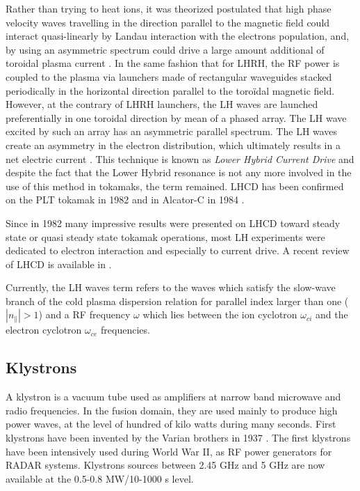 Rather than trying to heat ions, it was theorized postulated that high phase velocity waves travelling in the direction parallel to the magnetic field could interact quasi-linearly by Landau interaction with the electrons population, and, by using an asymmetric spectrum could drive a large amount additional of toroidal plasma current . In the same fashion that for LHRH, the RF power is coupled to the plasma via launchers made of rectangular waveguides stacked periodically in the horizontal direction parallel to the toroïdal magnetic field. However, at the contrary of LHRH launchers, the LH waves are launched preferentially in one toroidal direction by mean of a phased array. The LH wave excited by such an array has an asymmetric parallel spectrum. The LH waves create an asymmetry in the electron distribution, which ultimately results in a net electric current . This technique is known as \emph{Lower Hybrid Current Drive} and despite the fact that the Lower Hybrid resonance is not any more involved in the use of this method in tokamaks, the term remained. LHCD has been confirmed on the PLT tokamak in 1982  and in Alcator-C in 1984 . 

Since in 1982 many impressive results were presented on LHCD toward steady state or quasi steady state tokamak operations, most LH experiments were dedicated to electron interaction and especially to current drive. A recent review of LHCD is available in .

Currently, the LH waves term refers to the waves which satisfy the slow-wave branch of the cold plasma dispersion relation for parallel index larger than one ($|n_{\parallel}|>1$) and a RF frequency $\omega$ which lies between the ion cyclotron $\omega_{ci}$ and the electron cyclotron $\omega_{ce}$ frequencies. 



\subsection{Klystrons}
A klystron is a vacuum tube used as amplifiers at narrow band microwave and radio frequencies. In the fusion domain, they are used mainly to produce high power waves, at the level of hundred of kilo watts during many seconds. First klystrons have been invented by the Varian brothers in 1937 . The first klystrons have been intensively used during World War II, as RF power generators for RADAR systems. Klystrons sources between 2.45 GHz and 5 GHz are now available at the 0.5-0.8 MW/10-1000 s level. 

